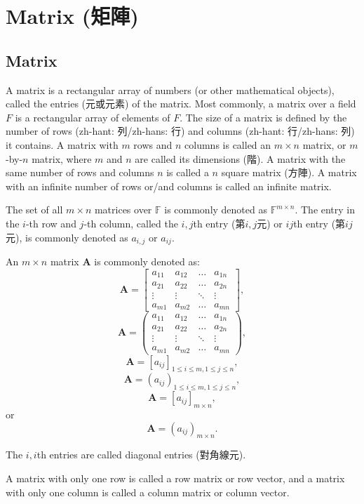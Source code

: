 \documentclass[a4paper,12pt]{report}
\begin{document}
\section{Matrix (矩陣)}
\subsection{Matrix}
A matrix is a rectangular array of numbers (or other mathematical objects), called the entries (元或元素) of the matrix. Most commonly, a matrix over a field $F$ is a rectangular array of elements of $F$.
The size of a matrix is defined by the number of rows (zh-hant: 列/zh-hans: 行) and columns (zh-hant: 行/zh-hans: 列) it contains. A matrix with $m$ rows and $n$ columns is called an $m\times n$ matrix, or $m$-by-$n$ matrix, where $m$ and $n$ are called its dimensions (階). A matrix with the same number of rows and columns $n$ is called a $n$ square matrix (方陣). A matrix with an infinite number of rows or/and columns is called an infinite matrix.

The set of all $m\times n$ matrices over $\mathbb{F}$ is commonly denoted as $\mathbb{F}^{m\times n}$.
The entry in the $i$-th row and $j$-th column, called the $i,j$th entry (第$i,j$元) or $ij$th entry (第$ij$元), is commonly denoted as $a_{i,j}$ or $a_{ij}$.

An $m\times n$ matrix $\mathbf{A}$ is commonly denoted as:
\[\mathbf{A}=\begin{bmatrix}a_{11} & a_{12} & \ldots & a_{1n}\\a_{21} & a_{22} & \ldots & a_{2n}\\\vdots & \vdots & \ddots & \vdots\\a_{m1} & a_{m2} & \ldots & a_{mn}\end{bmatrix},\]
\[\mathbf{A}=\begin{pmatrix}a_{11} & a_{12} & \ldots & a_{1n}\\a_{21} & a_{22} & \ldots & a_{2n}\\\vdots & \vdots & \ddots & \vdots\\a_{m1} & a_{m2} & \ldots & a_{mn}\end{pmatrix},\]
\[\mathbf{A}=[a_{ij}]_{1\leq i\leq m,1\leq j\leq n},\]
\[\mathbf{A}=(a_{ij})_{1\leq i\leq m,1\leq j\leq n},\]
\[\mathbf{A}=[a_{ij}]_{m\times n},\]
or
\[\mathbf{A}=(a_{ij})_{m\times n}.\]

The $i,i$th entries are called diagonal entries (對角線元).

A matrix with only one row is called a row matrix or row vector, and a matrix with only one column is called a column matrix or column vector.
\end{document}
